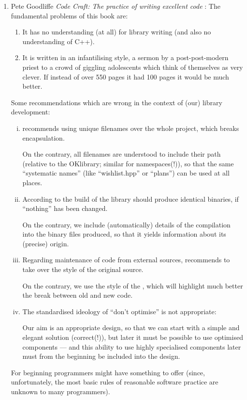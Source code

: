 \documentclass{book}
\begin{document}
\begin{enumerate}
\item Pete Goodliffe \textit{Code Craft: The practice of writing excellent code} \cite{OKL_Goodliffe2007AllBrilliant}: The fundamental problems of this book are:
  \begin{enumerate}
  \item It has no understanding (at all) for library writing (and also no understanding of C++).
  \item It is written in an infantilising style, a sermon by a post-post-modern priest to a crowd of giggling adolescents which think of themselves as very clever. If instead of over 550 pages it had 100 pages it would be much better.
  \end{enumerate}
  Some recommendations which are wrong in the context of (our) library development:
  \begin{enumerate}[(i)]
  \item \cite{OKL_Goodliffe2007AllBrilliant} recommends using unique filenames over the whole project, which breaks encapsulation.

    On the contrary, all filenames are understood to include their path (relative to the OKlibrary; similar for namespaces(!)), so that the same ``systematic names'' (like ``wishlist.hpp'' or ``plans'') can be used at all places.
  \item According to \cite{OKL_Goodliffe2007AllBrilliant} the build of the library should produce identical binaries, if ``nothing'' has been changed.

    On the contrary, we include (automatically) details of the compilation into the binary files produced, so that it yields information about its (precise) origin.
  \item Regarding maintenance of code from external sources, \cite{OKL_Goodliffe2007AllBrilliant} recommends to take over the style of the original source.

    On the contrary, we use the style of the \OKlibrary, which will highlight much better the break between old and new code.
  \item The standardised ideology of ``don't optimise'' is not appropriate:

    Our aim is an appropriate design, so that we can start with a simple and elegant solution (correct(!)), but later it must be possible to use optimised components --- and this ability to use highly specialised components later must from the beginning be included into the design.
  \end{enumerate}
  For beginning programmers \cite{OKL_Goodliffe2007AllBrilliant} might have something to offer (since, unfortunately, the most basic rules of reasonable software practice are unknown to many programmers).
\end{enumerate}
\end{document}

